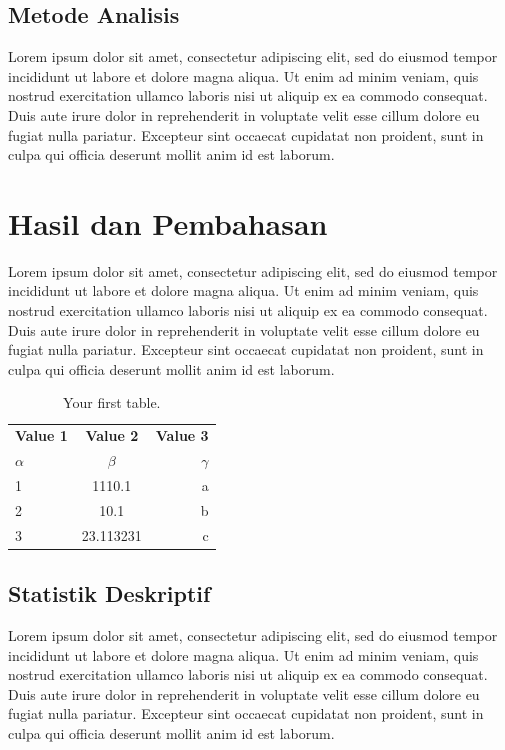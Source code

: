 \documentclass[12pt,hidelinks]{report}
\begin{document}
\section{Metode Analisis}
    Lorem ipsum dolor sit amet, consectetur adipiscing elit, sed do eiusmod tempor incididunt ut labore et dolore magna aliqua. Ut enim ad minim veniam, quis nostrud exercitation ullamco laboris nisi ut aliquip ex ea commodo consequat. Duis aute irure dolor in reprehenderit in voluptate velit esse cillum dolore eu fugiat nulla pariatur. Excepteur sint occaecat cupidatat non proident, sunt in culpa qui officia deserunt mollit anim id est laborum. 

\chapter{Hasil dan Pembahasan}
    Lorem ipsum dolor sit amet, consectetur adipiscing elit, sed do eiusmod tempor incididunt ut labore et dolore magna aliqua. Ut enim ad minim veniam, quis nostrud exercitation ullamco laboris nisi ut aliquip ex ea commodo consequat. Duis aute irure dolor in reprehenderit in voluptate velit esse cillum dolore eu fugiat nulla pariatur. Excepteur sint occaecat cupidatat non proident, sunt in culpa qui officia deserunt mollit anim id est laborum.

\begin{table}[h!]
  \begin{center}
    \caption{Your first table.}
    \label{tab:table1}
    \begin{tabular}{l|c|r} %
      \textbf{Value 1} & \textbf{Value 2} & \textbf{Value 3}\\
      $\alpha$ & $\beta$ & $\gamma$ \\
      \hline
      1 & 1110.1 & a\\
      2 & 10.1 & b\\
      3 & 23.113231 & c\\
    \end{tabular}
  \end{center}
\end{table}


\section{Statistik Deskriptif}
    Lorem ipsum dolor sit amet, consectetur adipiscing elit, sed do eiusmod tempor incididunt ut labore et dolore magna aliqua. Ut enim ad minim veniam, quis nostrud exercitation ullamco laboris nisi ut aliquip ex ea commodo consequat. Duis aute irure dolor in reprehenderit in voluptate velit esse cillum dolore eu fugiat nulla pariatur. Excepteur sint occaecat cupidatat non proident, sunt in culpa qui officia deserunt mollit anim id est laborum. 
\end{document}
